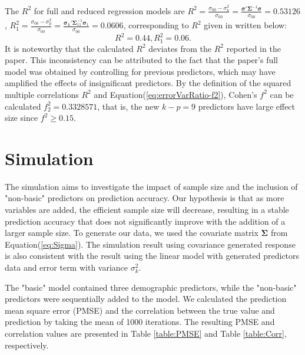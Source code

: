 The $R^2$ for full and reduced regression models are 
$R^2 = \frac{\sigma_{00}-\sigma^2_k}{\sigma_{00}} = \frac{\boldsymbol{\sigma}' \boldsymbol{\Sigma}^{-1} \boldsymbol{\sigma}}{\sigma_{00}} = 0.53126$, $R_1^2 = \frac{\sigma_{00}-\sigma^2_p}{\sigma_{00}} = \frac{\boldsymbol{\sigma_1}' \boldsymbol{\Sigma}_{11}^{-1} \boldsymbol{\sigma}_1}{\sigma_{00}} = 0.0606$,
corresponding to $R^2$ given in \cite{baker2008chronicpain} written below:
$$R^2 = 0.44, R_1^2 = 0.06.$$
It is noteworthy that the calculated $R^2$ deviates from the $R^2$ reported in the paper. This inconsistency can be attributed to the fact that the paper's full model was obtained by controlling for previous predictors, which may have amplified the effects of insignificant predictors. By the definition of the squared multiple correlations $R^2$ and Equation(\ref{eq:errorVarRatio-f2}), Cohen's $f^2$ can be calculated $f_2^2 = 0.3328571$, that is, the new $k-p = 9$ predictors have large effect size since $f^2\ge 0.15$.




\section{Simulation}

The simulation aims to investigate the impact of sample size and the inclusion of "non-basic" predictors on prediction accuracy.  Our hypothesis is that as more variables are added, the efficient sample size will decrease, resulting in a stable prediction accuracy that does not significantly improve with the addition of a larger sample size. To generate our data, we used the covariate matrix $\boldsymbol{\Sigma}$ from Equation(\ref{eq:Sigma}). The simulation result using covariance generated response is also consistent with the result using the linear model with generated predictors data and error term with variance $\sigma_k^2$.

The "basic" model contained three demographic predictors, while the "non-basic" predictors were sequentially added to the model. We calculated the prediction mean square error (PMSE) and the correlation between the true value and prediction by taking the mean of 1000 iterations. The resulting PMSE and correlation values are presented in Table \ref{table:PMSE} and Table \ref{table:Corr}, respectively.



